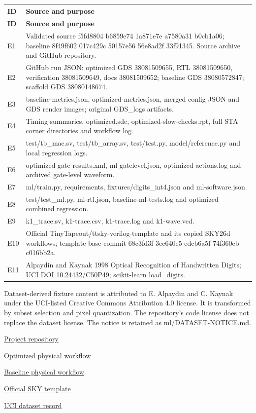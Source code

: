 \documentclass[10pt,letterpaper]{article}
\begin{document}
{\small\begin{longtable}{>{\raggedright\arraybackslash}p{0.088235\dimexpr\linewidth-4\tabcolsep\relax}>{\raggedright\arraybackslash}p{0.911765\dimexpr\linewidth-4\tabcolsep\relax}}\toprule
\textbf{ID} & \textbf{Source and purpose}\\\midrule\endfirsthead\textbf{ID} & \textbf{Source and purpose}\\\midrule\endhead
E1 & Validated source f5fd8804 b6859e74 1a871e7e a7580a31 b0cb1a06; baseline 8f49f602 017c429c 50157e56 56e8ad2f 33f91345. Source archive and GitHub repository.\\
E2 & GitHub run JSON: optimized GDS 38081509655, RTL 38081509650, verification 38081509649, docs 38081509652; baseline GDS 38080572847; scaffold GDS 38080148674.\\
E3 & baseline-metrics.json, optimized-metrics.json, merged config JSON and GDS render images; original GDS\_logs artifacts.\\
E4 & Timing summaries, optimized.sdc, optimized-slow-checks.rpt, full STA corner directories and workflow log.\\
E5 & test/tb\_mac.sv, test/tb\_array.sv, test/test.py, model/reference.py and local regression logs.\\
E6 & optimized-gate-results.xml, ml-gatelevel.json, optimized-actions.log and archived gate-level waveform.\\
E7 & ml/train.py, requirements, fixtures/digits\_int4.json and ml-software.json.\\
E8 & test/test\_ml.py, ml-rtl.json, baseline-ml-tests.log and optimized combined regression.\\
E9 & k1\_trace.sv, k1-trace.csv, k1-trace.log and k1-wave.vcd.\\
E10 & Official TinyTapeout/ttsky-verilog-template and its copied SKY26d workflows; template base commit 68c3fd3f 3ec640e5 edcb6a5f 74f360eb c016bb2a.\\
E11 & Alpaydin and Kaynak 1998 Optical Recognition of Handwritten Digits; UCI DOI 10.24432/C50P49; scikit-learn load\_digits.\\
\bottomrule\end{longtable}}
Dataset-derived fixture content is attributed to E. Alpaydin and C. Kaynak under the UCI-listed Creative Commons Attribution 4.0 license. It is transformed by subset selection and pixel quantization. The repository's code license does not replace the dataset license. The notice is retained as ml/DATASET-NOTICE.md.

\href{https://github.com/krishkc5/tiny-systolic}{Project repository}\par
\href{https://github.com/krishkc5/tiny-systolic/actions/runs/38081509655}{Optimized physical workflow}\par
\href{https://github.com/krishkc5/tiny-systolic/actions/runs/38080572847}{Baseline physical workflow}\par
\href{https://github.com/TinyTapeout/ttsky-verilog-template}{Official SKY template}\par
\href{https://doi.org/10.24432/C50P49}{UCI dataset record}\par
\end{document}
